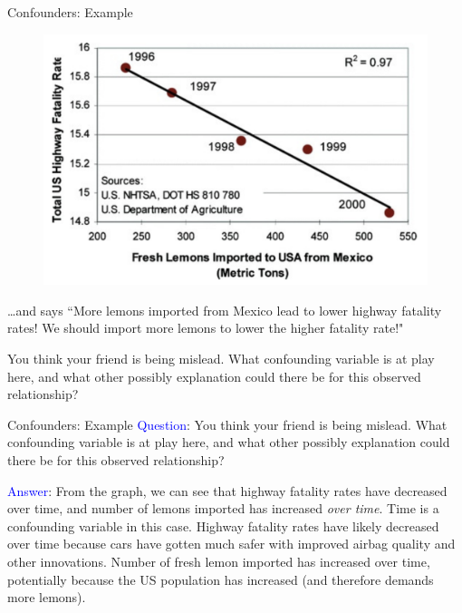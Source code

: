 \documentclass[10pt,t]{beamer}
\begin{document}
\begin{frame}{Confounders: Example}
\begin{figure}
	\centering \includegraphics[scale=0.3]{lemons.png}
\end{figure}

\vspace{0.1cm} 

\dots and says ``More lemons imported from Mexico lead to lower highway fatality rates! We should import more lemons to lower the higher fatality rate!"

\vspace{0.3cm}

You think your friend is being mislead. What confounding variable is at play here, and what other possibly explanation could there be for this observed relationship?
\end{frame}

\begin{frame}{Confounders: Example}
\textcolor{blue}{Question}: You think your friend is being mislead. What confounding variable is at play here, and what other possibly explanation could there be for this observed relationship?

\vspace{0.3cm}

\textcolor{blue}{Answer}: From the graph, we can see that highway fatality rates have decreased over time, and number of lemons imported has increased \textit{over time}. Time is a confounding variable in this case. Highway fatality rates have likely decreased over time because cars have gotten much safer with improved airbag quality and other innovations. Number of fresh lemon imported has increased over time, potentially because the US population has increased (and therefore demands more lemons).
\end{frame}
\end{document}

